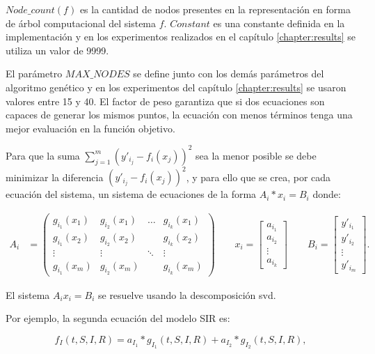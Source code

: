 $Node\_count(f)$ es la cantidad de nodos presentes en la representación en forma de árbol computacional del sistema $f$. $Constant$ es una constante definida en la implementación y en los experimentos realizados en el capítulo \ref{chapter:results} se utiliza un valor de 9999.

El parámetro $MAX\_NODES$ se define junto con los demás parámetros del algoritmo genético y en los experimentos del capítulo \ref{chapter:results} se usaron valores entre 15 y 40. El factor de peso garantiza que si dos ecuaciones son capaces de generar los mismos puntos, la ecuación con menos términos tenga una mejor evaluación en la función objetivo.

Para que la suma $\sum_{j=1}^{m}(y'_{i_j} - f_i(x_j)) ^ 2$ sea la menor posible se debe minimizar la diferencia $(y'_{i_j} - f_i(x_j))^2$, y para ello que se crea, por cada ecuación del sistema, un sistema de ecuaciones de la forma $A_i * x_i = B_i$ donde:

\begin{align*}
    A_i & = \begin{pmatrix}
        g_{i_1}(x_1) & g_{i_2}(x_1) & \dots  & g_{i_k}(x_1) \\
        g_{i_1}(x_2) & g_{i_2}(x_2) &        & g_{i_k}(x_2) \\
        \vdots       & \vdots       & \ddots & \vdots       \\
        g_{i_1}(x_m) & g_{i_2}(x_m) &        & g_{i_k}(x_m)
    \end{pmatrix}
    \qquad
    x_i = \begin{bmatrix}
        a_{i_1} \\
        a_{i_2} \\
        \vdots  \\
        a_{i_k}
    \end{bmatrix}
    \qquad
    B_i = \begin{bmatrix}
        y'_{i_1} \\
        y'_{i_2} \\
        \vdots   \\
        y'_{i_m}
    \end{bmatrix}.
\end{align*}

El sistema $A_ix_i = B_i$ se resuelve usando la descomposición svd.

Por ejemplo, la segunda ecuación del modelo SIR es:

$$f_I (t,S,I,R) = a_{I_1} * g_{I_1}(t,S,I,R) + a_{I_2} * g_{I_2}(t,S,I,R),$$

